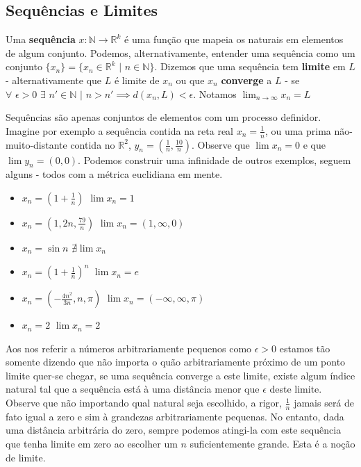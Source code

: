 \subsection{Sequências e Limites}


\begin{defi}
Uma \textbf{sequência} $x:\mathbb{N} \to \mathbb{R}^k$ é uma função que mapeia os naturais em elementos de algum conjunto. Podemos, alternativamente, entender uma sequência como um conjunto $\{x_n\} = \{ x_n \in \mathbb{R}^k \,\, | \,\, n \in \mathbb{N}\}$. Dizemos que uma sequência tem \textbf{limite} em $L$ - alternativamente que $L$ é limite de $x_n$ ou que $x_n$ \textbf{converge} a $L$ - se $\forall \,\, \epsilon > 0 \,\, \exists \,\, n' \in \mathbb{N} \,\, | \,\, n > n' \implies d(x_n, L) < \epsilon$. Notamos $\lim_{n \to \infty} x_n = L$
\end{defi}

Sequências são apenas conjuntos de elementos com um processo definidor. Imagine por exemplo a sequência contida na reta real $x_n = \frac{1}{n}$, ou uma prima não-muito-distante contida no $\mathbb{R}^2$, $y_n = (\frac{1}{n}, \frac{10}{n})$. Observe que $\lim x_n = 0$ e que $\lim y_n = (0,0)$. Podemos construir uma infinidade de outros exemplos, seguem alguns - todos com a métrica euclidiana em mente.

\begin{itemize}
    \item $x_n = (1 + \frac{1}{n})$ \implies 
    $\lim x_n = 1$ 
    \item $x_n = (1, 2n, \frac{79}{n})$ \implies
    $\lim x_n = (1, \infty, 0)$
    \item $x_n = \sin{n}$ \implies
    $\nexists \lim x_n$
    \item $x_n = (1+\frac{1}{n})^n$ \implies $\lim x_n = e$
    \item $x_n = (-\frac{4n^2}{3n}, n, \pi)$ \implies $\lim x_n = (-\infty, \infty, \pi)$
    \item $x_n = 2$ \implies $\lim x_n = 2$
\end{itemize}


Aos nos referir a números arbitrariamente pequenos como $\epsilon > 0$ estamos tão somente dizendo que não importa o quão arbitrariamente próximo de um ponto limite quer-se chegar, se uma sequência converge a este limite, existe algum índice natural tal que a sequência está à uma distância menor que $\epsilon$ deste limite. Observe que não importando qual natural seja escolhido, a rigor, $\frac{1}{n}$ jamais será de fato igual a zero e sim à grandezas arbitrariamente pequenas. No entanto, dada uma distância arbitrária do zero, sempre podemos atingi-la com este sequência que tenha limite em zero ao escolher um $n$ suficientemente grande. Esta é a noção de limite.

